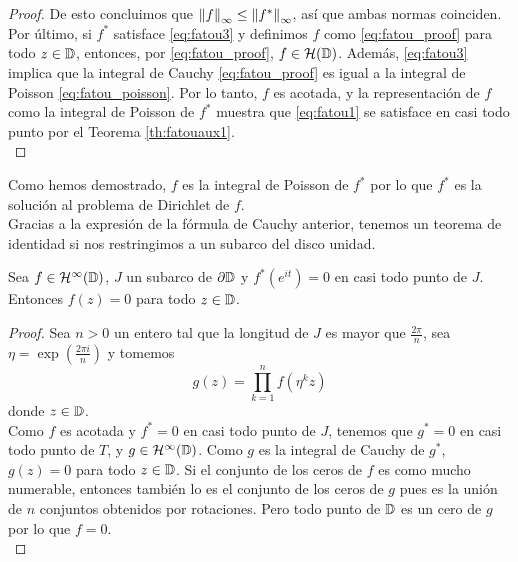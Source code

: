 \begin{proof}
    De esto concluimos que $\left\lVert f\right\rVert_{\infty} \leq \left\lVert f^*\right\rVert_{\infty}$, así que ambas normas coinciden. \\

    Por último, si $f^*$ satisface \eqref{eq:fatou3} y definimos $f$ como \eqref{eq:fatou_proof} para todo $z \in \mathbb{D}$, entonces, por \eqref{eq:fatou_proof}, $f \in \mathcal{H}(\mathbb{D})$. Además, \eqref{eq:fatou3} implica que la integral de Cauchy \eqref{eq:fatou_proof} es igual a la integral de Poisson \eqref{eq:fatou_poisson}. Por lo tanto, $f$ es acotada, y la representación de $f$ como la integral de Poisson de $f^*$ muestra que \eqref{eq:fatou1} se satisface en casi todo punto por el Teorema \ref{th:fatouaux1}. \\
\end{proof}

Como hemos demostrado, $f$ es la integral de Poisson de $f^*$ por lo que $f^*$ es la solución al problema de Dirichlet de $f$.\\

Gracias a la expresión de la fórmula de Cauchy anterior, tenemos un teorema de identidad si nos restringimos a un subarco del disco unidad. \\

\begin{theorem}
    Sea $f \in \mathcal{H}^{\infty}(\mathbb{D})$, $J$ un subarco de $\partial \mathbb{D}$ y $f^*(e^{it}) = 0$ en casi todo punto de $J$. Entonces $f(z) = 0$ para todo $z \in \mathbb{D}$.
\end{theorem}

\begin{proof}
    Sea $n > 0$ un entero tal que la longitud de $J$ es mayor que $\frac{2 \pi}{n}$, sea $\eta = \exp(\frac{2 \pi i}{n})$ y tomemos
    \begin{equation*}
        g(z) = \prod_{k=1}^{n} f(\eta^k z)
    \end{equation*}
    donde $z \in \mathbb{D}$. \\

    Como $f$ es acotada y $f^* = 0$ en casi todo punto de $J$, tenemos que $g^* = 0$ en casi todo punto de $T$, y $g \in \mathcal{H}^{\infty}(\mathbb{D})$. Como $g$ es la integral de Cauchy de $g^*$, $g(z) = 0$ para todo $z \in \mathbb{D}$. Si el conjunto de los ceros de $f$ es como mucho numerable, entonces también lo es el conjunto de los ceros de $g$ pues es la unión de $n$ conjuntos obtenidos por rotaciones. Pero todo punto de $\mathbb{D}$ es un cero de $g$ por lo que $f = 0$. \\
\end{proof}

